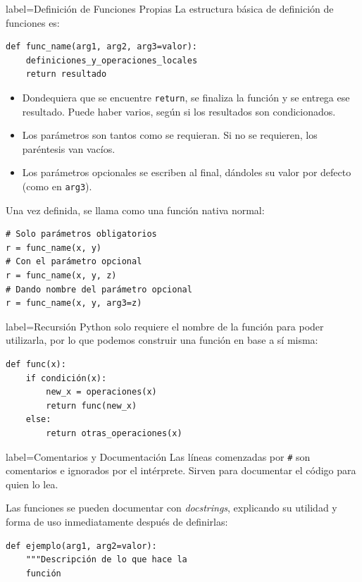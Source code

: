 \documentclass[10pt]{article}
\begin{document}
\begin{multicols*}{3}
\begin{contentbox}{label=Definición de Funciones Propias}
    La estructura básica de definición de funciones es:
\begin{lstlisting}
def func_name(arg1, arg2, arg3=valor):
    definiciones_y_operaciones_locales
    return resultado
\end{lstlisting}

    \begin{itemize}
        \item Dondequiera que se encuentre \lstinline!return!, se finaliza la función y se entrega ese resultado. Puede haber varios, según si los resultados son condicionados.
        \item Los parámetros son tantos como se requieran. Si no se requieren, los paréntesis van vacíos.
        \item Los parámetros opcionales se escriben al final, dándoles su valor por defecto (como en \verb|arg3|).%
    \end{itemize}

    Una vez definida, se llama como una función nativa normal:
\begin{lstlisting}
# Solo parámetros obligatorios
r = func_name(x, y)
# Con el parámetro opcional
r = func_name(x, y, z)
# Dando nombre del parámetro opcional
r = func_name(x, y, arg3=z)
\end{lstlisting}
\end{contentbox}

\begin{contentbox}{label=Recursión}
    Python solo requiere el nombre de la función para poder utilizarla, por lo que podemos construir una función en base a sí misma:
\begin{lstlisting}
def func(x):
    if condición(x):
        new_x = operaciones(x)
        return func(new_x)
    else:
        return otras_operaciones(x)
\end{lstlisting}
\end{contentbox}

\begin{contentbox}{label=Comentarios y Documentación}
    Las líneas comenzadas por \lstinline!#! son comentarios e ignorados por el intérprete. Sirven para documentar el código para quien lo lea.
    
    Las funciones se pueden documentar con \textit{docstrings}, explicando su utilidad y forma de uso inmediatamente después de definirlas:
\begin{lstlisting}
def ejemplo(arg1, arg2=valor):
    """Descripción de lo que hace la
    función
    

\end{lstlisting}
\end{contentbox}
\end{multicols*}
\end{document}
